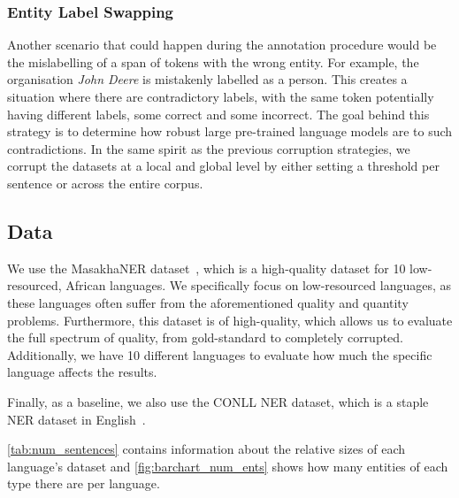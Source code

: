 \documentclass{article}
\begin{document}
\subsubsection{Entity Label Swapping}
\label{sec:method:swapping}

Another scenario that could happen during the annotation procedure would be the mislabelling of a span of tokens with the wrong entity. For example, the organisation \textit{John Deere} is mistakenly labelled as a person. This creates a situation where there are contradictory labels, with the same token potentially having different labels, some correct and some incorrect. The goal behind this strategy is to determine how robust large pre-trained language models are to such contradictions. 
In the same spirit as the previous corruption strategies, we corrupt the datasets at a local and global level by either setting a threshold per sentence or across the entire corpus.


\subsection{Data}
\label{sec:data}
We use the MasakhaNER dataset~\citep{adelani2021MasakhaNER}, which is a high-quality dataset for 10 low-resourced, African languages. We specifically focus on low-resourced languages, as these languages often suffer from the aforementioned quality and quantity problems. Furthermore, this dataset is of high-quality, which allows us to evaluate the full spectrum of quality, from gold-standard to completely corrupted. Additionally, we have 10 different languages to evaluate how much the specific language affects the results.

Finally, as a baseline, we also use the CONLL NER dataset, which is a staple NER dataset in English~\citep{sang2003introduction_conll}.

\autoref{tab:num_sentences} contains information about the relative sizes of each language's dataset and \autoref{fig:barchart_num_ents} shows how many entities of each type there are per language.
\end{document}
